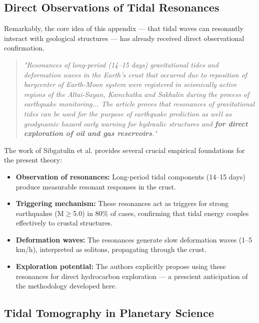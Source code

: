 \documentclass[12pt,a4paper]{article}
\theoremstyle{remark}
\begin{document}
	\subsection{Direct Observations of Tidal Resonances}
	
	Remarkably, the core idea of this appendix — that tidal waves can resonantly interact with geological structures — has already received direct observational confirmation.
	
	\begin{quotation}
		\noindent
		\textit{"Resonances of long-period (14–15 days) gravitational tides and deformation waves in the Earth's crust that occurred due to reposition of barycenter of Earth-Moon system were registered in seismically active regions of the Altai-Sayan, Kamchatka and Sakhalin during the process of earthquake monitoring... The article proves that resonances of gravitational tides can be used for the purpose of earthquake prediction as well as geodynamic hazard early warning for hydraulic structures and \textbf{for direct exploration of oil and gas reservoirs}."} \cite{Sibgatulin2014}
	\end{quotation}
	
	The work of Sibgatulin et al. \cite{Sibgatulin2014} provides several crucial empirical foundations for the present theory:
	
	\begin{itemize}
		\item \textbf{Observation of resonances:} Long-period tidal components (14–15 days) produce measurable resonant responses in the crust.
		\item \textbf{Triggering mechanism:} These resonances act as triggers for strong earthquakes (M$\ge$5.0) in 80\% of cases, confirming that tidal energy couples effectively to crustal structures.
		\item \textbf{Deformation waves:} The resonances generate slow deformation waves (1–5 km/h), interpreted as solitons, propagating through the crust.
		\item \textbf{Exploration potential:} The authors explicitly propose using these resonances for direct hydrocarbon exploration — a prescient anticipation of the methodology developed here.
	\end{itemize}
	
	\subsection{Tidal Tomography in Planetary Science}
	
\end{document}
